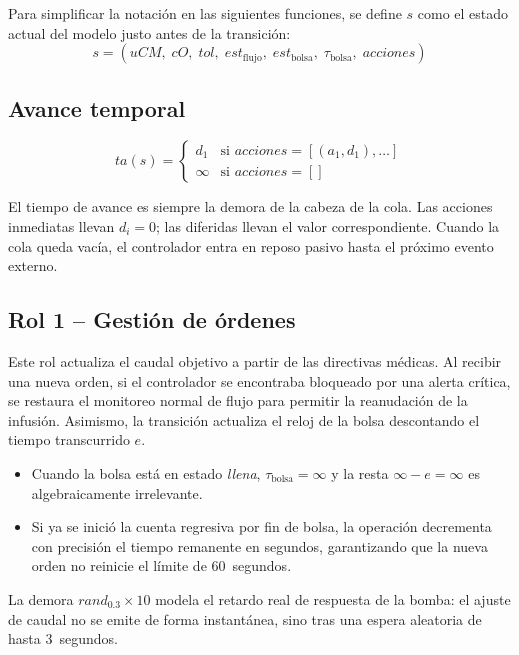 \documentclass{article}
\begin{document}
Para simplificar la notación en las siguientes funciones, se define $s$
como el estado actual del modelo justo antes de la transición:
\[
  s = (uCM,\;cO,\;tol,\;est_{\mathrm{flujo}},\;est_{\mathrm{bolsa}},\;
       \tau_{\mathrm{bolsa}},\;\mathit{acciones})
\]



\subsection{Avance temporal}

\[
  ta(s) =
  \begin{cases}
    d_1    & \text{si } \mathit{acciones} = [(a_1,d_1),\ldots] \\
    \infty & \text{si } \mathit{acciones} = []
  \end{cases}
\]

El tiempo de avance es siempre la demora de la cabeza de la cola.
Las acciones inmediatas llevan $d_i = 0$; las diferidas llevan el valor
correspondiente. Cuando la cola queda vacía, el controlador entra en reposo
pasivo hasta el próximo evento externo.

\subsection{Rol 1 – Gestión de órdenes}

Este rol actualiza el caudal objetivo a partir de las directivas médicas.
Al recibir una nueva orden, si el controlador se encontraba bloqueado por
una alerta crítica, se restaura el monitoreo normal de flujo para permitir
la reanudación de la infusión. Asimismo, la transición actualiza el reloj de
la bolsa descontando el tiempo transcurrido $e$.

\begin{itemize}
  \item Cuando la bolsa está en estado \textit{llena}, $\tau_{\mathrm{bolsa}} = \infty$
        y la resta $\infty - e = \infty$ es algebraicamente irrelevante.
  \item Si ya se inició la cuenta regresiva por fin de bolsa, la operación
        decrementa con precisión el tiempo remanente en segundos, garantizando
        que la nueva orden no reinicie el límite de 60~segundos.
\end{itemize}

La demora $\mathit{rand}_{0.3} \times 10$ modela el retardo real de respuesta
de la bomba: el ajuste de caudal no se emite de forma instantánea, sino tras
una espera aleatoria de hasta 3~segundos.
\end{document}
